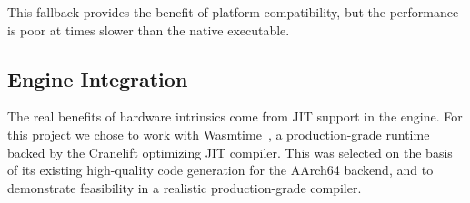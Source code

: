 This fallback provides the benefit of platform compatibility, but the
performance is poor at \MetricGenericWasmtimeBaselineDivNative times slower than
the native executable.


\subsection{Engine Integration}
\label{sec:engine}

The real benefits of hardware intrinsics come from JIT support in the \wasm
engine. For this project we chose to work with Wasmtime~\cite{wasmtime}, a
production-grade \wasm runtime backed by the Cranelift optimizing JIT compiler.
This was selected on the basis of its existing high-quality code generation for
the AArch64 backend, and to demonstrate feasibility in a realistic
production-grade compiler.

